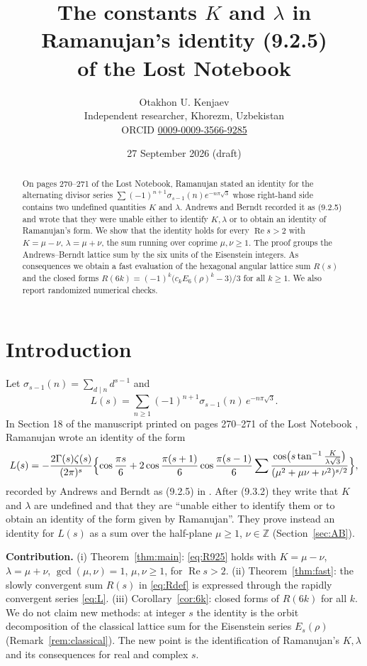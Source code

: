 \documentclass[11pt]{article}
\title{The constants $K$ and $\lambda$ in Ramanujan's identity (9.2.5)\\ of the Lost Notebook}
\author{Otakhon U. Kenjaev\\ \small Independent researcher, Khorezm, Uzbekistan\\
\small ORCID \href{https://orcid.org/0009-0009-3566-9285}{0009-0009-3566-9285}}
\date{27 September 2026 \quad (draft)}
\theoremstyle{remark}
\begin{document}
\maketitle

\begin{abstract}
On pages 270--271 of the Lost Notebook, Ramanujan stated an identity for the alternating divisor series
$\sum(-1)^{n+1}\sigma_{s-1}(n)e^{-n\pi\sqrt3}$ whose right-hand side contains two undefined quantities $K$ and $\lambda$.
Andrews and Berndt recorded it as (9.2.5) and wrote that they were unable either to identify $K,\lambda$ or to obtain an identity
of Ramanujan's form. We show that the identity holds for every $\operatorname{Re}s>2$ with $K=\mu-\nu$, $\lambda=\mu+\nu$, the sum
running over coprime $\mu,\nu\ge1$. The proof groups the Andrews--Berndt lattice sum by the six units of the Eisenstein integers.
As consequences we obtain a fast evaluation of the hexagonal angular lattice sum $R(s)$ and the closed forms
$R(6k)=(-1)^k\bigl(c_kE_6(\rho)^k-3\bigr)/3$ for all $k\ge1$. We also report randomized numerical checks.
\end{abstract}

\section{Introduction}
Let $\sigma_{s-1}(n)=\sum_{d\mid n}d^{s-1}$ and
\begin{equation}\label{eq:L}
L(s)=\sum_{n\ge1}(-1)^{n+1}\sigma_{s-1}(n)\,e^{-n\pi\sqrt3}.
\end{equation}
In Section 18 of the manuscript printed on pages 270--271 of the Lost Notebook \cite{LN}, Ramanujan wrote an identity of the form
\begin{equation}\label{eq:R925}
L(s)=-\frac{2\Gamma(s)\zeta(s)}{(2\pi)^s}\Bigl\{\cos\frac{\pi s}{6}+2\cos\frac{\pi(s+1)}{6}\cos\frac{\pi(s-1)}{6}
\sum\frac{\cos\bigl(s\tan^{-1}\frac{K}{\lambda\sqrt3}\bigr)}{(\mu^2+\mu\nu+\nu^2)^{s/2}}\Bigr\},
\end{equation}
recorded by Andrews and Berndt as (9.2.5) in \cite[\S9.2]{AB4}. After (9.3.2) they write that $K$ and $\lambda$ are undefined and that
they are ``unable either to identify them or to obtain an identity of the form given by Ramanujan''. They prove instead an identity
for $L(s)$ as a sum over the half-plane $\mu\ge1$, $\nu\in\mathbb Z$ (Section~\ref{sec:AB}).

\medskip\noindent\textbf{Contribution.} (i) Theorem~\ref{thm:main}: \eqref{eq:R925} holds with $K=\mu-\nu$, $\lambda=\mu+\nu$,
$\gcd(\mu,\nu)=1$, $\mu,\nu\ge1$, for $\operatorname{Re}s>2$. (ii) Theorem~\ref{thm:fast}: the slowly convergent sum $R(s)$ in
\eqref{eq:Rdef} is expressed through the rapidly convergent series \eqref{eq:L}. (iii) Corollary~\ref{cor:6k}: closed forms of $R(6k)$
for all $k$. We do not claim new methods: at integer $s$ the identity is the orbit decomposition of the classical lattice sum for the
Eisenstein series $E_s(\rho)$ (Remark~\ref{rem:classical}). The new point is the identification of Ramanujan's $K,\lambda$ and
its consequences for real and complex $s$.
\end{document}
